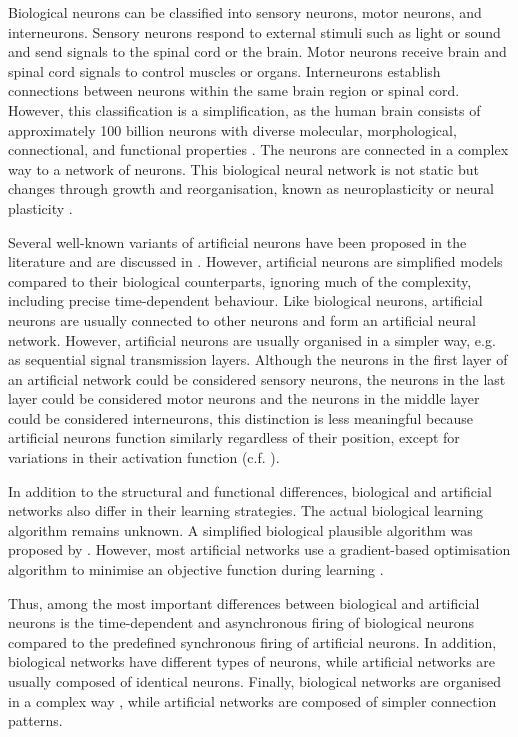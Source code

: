 Biological neurons can be classified into sensory neurons, motor neurons, and interneurons.
Sensory neurons respond to external stimuli such as light or sound and send signals to the spinal cord or the brain.
Motor neurons receive brain and spinal cord signals to control muscles or organs.
Interneurons establish connections between neurons within the same brain region or spinal cord.
However, this classification is a simplification, as the human brain consists of approximately 100 billion neurons  with diverse molecular, morphological, connectional, and functional properties .
The neurons are connected in a complex way to a network of neurons. This biological neural network is not static but changes through growth and reorganisation, known as neuroplasticity or neural plasticity .

Several well-known variants of artificial neurons have been proposed in the literature and are discussed in .
However, artificial neurons are simplified models compared to their biological counterparts, ignoring much of the complexity, including precise time-dependent behaviour. Like biological neurons, artificial neurons are usually connected to other neurons and form an artificial neural network. However, artificial neurons are usually organised in a simpler way, e.g. as sequential signal transmission layers. Although the neurons in the first layer of an artificial network could be considered sensory neurons, the neurons in the last layer could be considered motor neurons and the neurons in the middle layer could be considered interneurons, this distinction is less meaningful because artificial neurons function similarly regardless of their position, except for variations in their activation function (c.f. ).

In addition to the structural and functional differences, biological and artificial networks also differ in their learning strategies. The actual biological learning algorithm remains unknown. A simplified biological plausible algorithm was proposed by . However, most artificial networks use a gradient-based optimisation algorithm to minimise an objective function during learning .

Thus, among the most important differences between biological and artificial neurons is the time-dependent and asynchronous firing of biological neurons compared to the predefined synchronous firing of artificial neurons. In addition, biological networks have different types of neurons, while artificial networks are usually composed of identical neurons. Finally, biological networks are organised in a complex way , while artificial networks are composed of simpler connection patterns.













